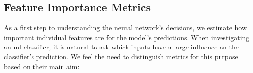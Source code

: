 \documentclass[conference]{IEEEtran}
\begin{document}
\subsection{Feature Importance Metrics}
As a first step to understanding the neural network's decisions, we  estimate how important individual features are for the model's predictions.
When investigating an \gls{ml} classifier, it is natural to ask which inputs have a large influence on the classifier's prediction. We feel the need to distinguish metrics for this purpose based on their main aim:
\end{document}
